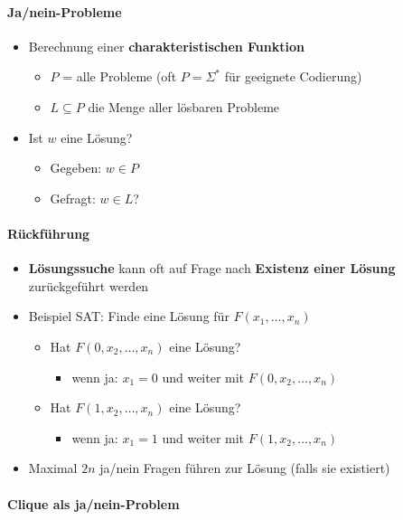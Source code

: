 \documentclass{scrartcl}
\begin{document}
\paragraph{Ja/nein-Probleme}

\begin{itemize}
	\item Berechnung einer \textbf{charakteristischen Funktion}
	\begin{itemize}
		\item $P$ = alle Probleme (oft $P = \Sigma^*$ für geeignete Codierung)
		\item $L \subseteq P$ die Menge aller lösbaren Probleme
	\end{itemize}
	\item Ist $w$ eine Lösung?
	\begin{itemize}
		\item Gegeben: $w \in P$
		\item Gefragt: $w \in L$?
	\end{itemize}
\end{itemize}

\paragraph{Rückführung}

\begin{itemize}
	\item \textbf{Lösungssuche} kann oft auf Frage nach \textbf{Existenz einer Lösung} zurückgeführt werden
	\item Beispiel SAT: Finde eine Lösung für $F(x_1,\ldots,x_n)$
	\begin{itemize}
		\item Hat $F(0,x_2,\ldots,x_n)$ eine Lösung?
		\begin{itemize}
			\item wenn ja: $x_1 = 0$ und weiter mit $F(0,x_2,\ldots,x_n)$
		\end{itemize}
		\item Hat $F(1,x_2,\ldots,x_n)$ eine Lösung?
		\begin{itemize}
			\item wenn ja: $x_1 = 1$ und weiter mit $F(1,x_2,\ldots,x_n)$
		\end{itemize}
	\end{itemize}
	\item Maximal $2n$ ja/nein Fragen führen zur Lösung (falls sie existiert)
\end{itemize}

\paragraph{Clique als ja/nein-Problem}
\end{document}
